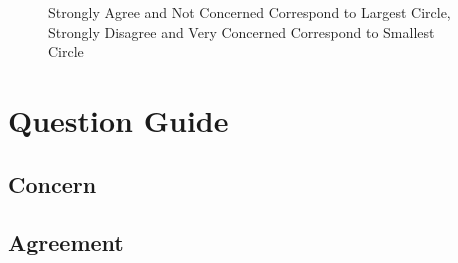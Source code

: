 \documentclass{article}%
\begin{document}

\newpage
\begin{figure}[H]
  \center
  \caption*{\tiny Strongly Agree and Not Concerned Correspond to Largest Circle, Strongly Disagree and Very Concerned Correspond to Smallest Circle}
\end{figure}
\section*{\small Question Guide}
\subsection*{\small Concern}
{\small

}
\subsection*{\small Agreement}
{\small

}
\end{document}
